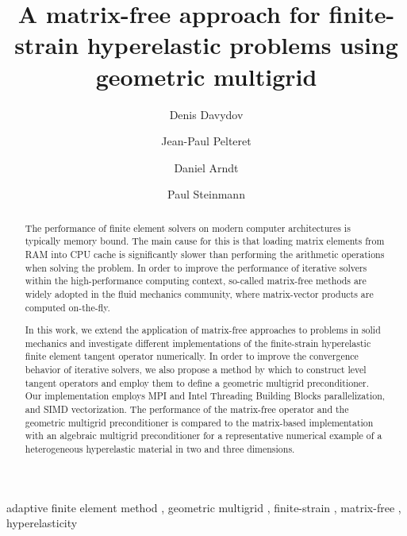 \documentclass[preprint,12pt,times]{elsarticle}
\begin{document}
\begin{frontmatter}
  \title{
  A matrix-free approach for finite-strain hyperelastic problems using geometric multigrid
  }

  \author[a]{Denis Davydov}

  \author[a]{Jean-Paul Pelteret}

  \author[b]{Daniel Arndt}

  \author[a,c]{Paul Steinmann}


  \address[a]{Chair of Applied Mechanics,
  Friedrich-Alexander-Universit\"{a}t Erlangen-N\"{u}rnberg,
  Egerlandstr.\ 5, 91058 Erlangen, Germany}

  \address[b]{Interdisciplinary Center for Scientific Computing (IWR),
      Heidelberg University,
      Im Neuenheimer Feld 205,
      69120 Heidelberg,
      Germany}

  \address[c]{Glasgow Computational Engineering Center (GCEC),
      University of Glasgow, G12 8QQ Glasgow, United Kingdom
  }


  \begin{abstract}
    The performance of finite element solvers on modern computer architectures is typically memory bound.
    The main cause for this is that loading matrix elements from RAM into CPU cache is significantly slower than performing the arithmetic operations when solving the problem.
    In order to improve the performance of iterative solvers within the high-performance computing context, so-called matrix-free methods are
    widely adopted in the fluid mechanics community, where matrix-vector products are computed on-the-fly.

    In this work, we extend the application of matrix-free approaches to problems in solid mechanics and investigate different implementations of the finite-strain hyperelastic {\color{red}finite element} tangent operator numerically.
    In order to improve the convergence behavior of iterative solvers, we also propose a method by which to construct level tangent operators
    and employ them to define a geometric multigrid preconditioner.
    Our implementation employs MPI and Intel Threading Building Blocks parallelization, and SIMD vectorization.
    The performance of the matrix-free operator and the geometric multigrid preconditioner is compared to the matrix-based implementation with an algebraic multigrid preconditioner for a representative numerical example of a heterogeneous hyperelastic material in two and three dimensions.
  \end{abstract}


  \begin{keyword}
      adaptive finite element method \sep
      geometric multigrid \sep
      finite-strain \sep
      matrix-free \sep
      hyperelasticity
  \end{keyword}

  \end{frontmatter}
\end{document}
